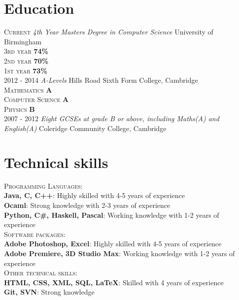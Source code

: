 \documentclass[a4paper, 10pt]{article}
\newcommand\tab[1][1cm]{\hspace*{#1}}
\begin{document}
\section{Education}
\textsc{Current} \emph{4th Year Masters Degree in Computer Science} University of Birmingham\\
 \tab\textsc{3rd year} \textbf{74\%} \\
 \tab\textsc{2nd year} \textbf{70\%} \\
 \tab\textsc{1st year} \textbf{73\%}\\
\textsc{2012 - 2014} \emph{A-Levels} Hills Road Sixth Form College, Cambridge \\
	\tab\textsc{Mathematics} \textbf{A} \\
	\tab\textsc{Computer Science} \textbf{A} \\
	\tab\textsc{Physics} \textbf{B}\\
\textsc{2007 - 2012} \emph{Eight GCSEs at grade B or above, including Maths(A) and English(A)} Coleridge Community College, Cambridge

\section{Technical skills}
 \textsc{Programming Languages:}\\
 \tab\textbf{Java, C, C++}: Highly skilled with 4-5 years of experience\\
 \tab\textbf{Ocaml}: Strong knowledge with 2-3 years of experience\\
 \tab\textbf{Python, C\#, Haskell, Pascal}: Working knowledge with 1-2 years of experience\\
 \textsc{Software packages:}\\
 \tab\textbf{Adobe Photoshop, Excel}: Highly skilled with 4-5 years of experience\\
 \tab\textbf{Adobe Premiere, 3D Studio Max}: Working knowledge with 1-2 years of experience\\
 \textsc{Other technical skills:}\\
 \tab\textbf{HTML, CSS, XML, SQL, LaTeX}: Skilled with 4 years of experience\\
 \tab\textbf{Git, SVN}: Strong knowledge

\end{document}
